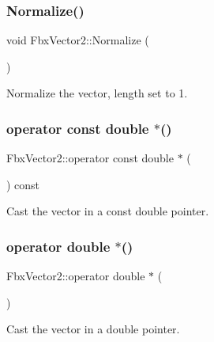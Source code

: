 \subsubsection{\texorpdfstring{Normalize()}{Normalize()}}
{\footnotesize\ttfamily void Fbx\+Vector2\+::\+Normalize (\begin{DoxyParamCaption}{ }\end{DoxyParamCaption})}



Normalize the vector, length set to 1. 

\mbox{\label{class_fbx_vector2_aa3d10afdd6d8efcf92a5c19132130f66}} 
\subsubsection{\texorpdfstring{operator const double $\ast$()}{operator const double *()}}
{\footnotesize\ttfamily Fbx\+Vector2\+::operator const double $\ast$ (\begin{DoxyParamCaption}{ }\end{DoxyParamCaption}) const}



Cast the vector in a const double pointer. 

\mbox{\label{class_fbx_vector2_ada2a29fdcddde9235505716bd2b2d756}} 
\subsubsection{\texorpdfstring{operator double $\ast$()}{operator double *()}}
{\footnotesize\ttfamily Fbx\+Vector2\+::operator double $\ast$ (\begin{DoxyParamCaption}{ }\end{DoxyParamCaption})}



Cast the vector in a double pointer. 

\mbox{\label{class_fbx_vector2_a9047e886e7588b3f46faf8949346833f}} 
